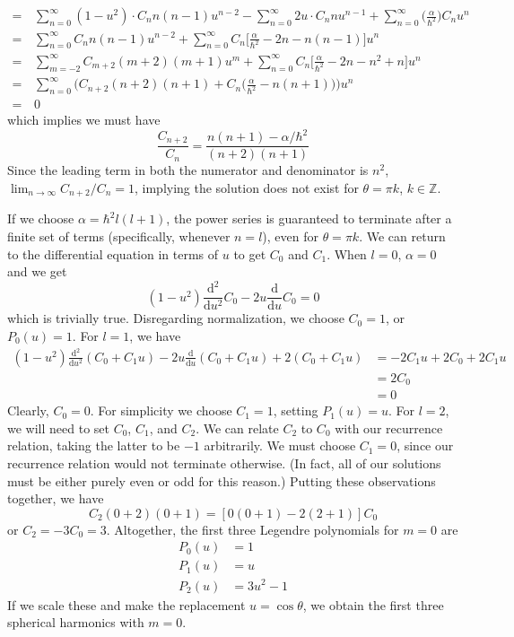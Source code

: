 \documentclass[../principles-of-quantum-mechanics.tex]{subfiles}
\begin{document}
\begin{questions}
\begin{solution}
\begin{align*}
				=\,&\sum_{n=0}^{\infty}(1 - u^2)\cdot C_n n(n-1) u^{n-2} - \sum_{n=0}^{\infty}2u\cdot C_nnu^{n-1} + \sum_{n=0}^{\infty}\Big(\frac{\alpha}{\hbar^2}\Big)C_n u^n \\
				=\,&\sum_{n=0}^{\infty}C_nn(n-1)u^{n-2} + \sum_{n=0}^{\infty}C_n\Big[\frac{\alpha}{\hbar^2} - 2n - n(n-1)\Big]u^n \\
				=\,&\sum_{m={-2}}^{\infty}C_{m + 2}(m + 2)(m + 1)u^m + \sum_{n=0}^{\infty}C_n\Big[\frac{\alpha}{\hbar^2} - 2n - n^2 + n\Big]u^n \\
				=\,&\sum_{n=0}^{\infty}\Big(C_{n+2}(n + 2)(n + 1) + C_n\big(\frac{\alpha}{\hbar^2} - n(n + 1)\big)\Big)u^n \\
				=\,&0
			\end{align*}
			which implies we must have
			$$\frac{C_{n+2}}{C_n} = \frac{n(n + 1) - \alpha/\hbar^2}{(n + 2)(n + 1)}$$
			Since the leading term in both the numerator and denominator is $n^2$, $\lim_{n\to\infty} C_{n+2}/C_n = 1$, implying the solution does not exist for $\theta = \pi k$, $k \in \mathbb{Z}$.
			
			If we choose $\alpha = \hbar^2l(l + 1)$, the power series is guaranteed to terminate after a finite set of terms (specifically, whenever $n = l$), even for $\theta = \pi k$. We can return to the differential equation in terms of $u$ to get $C_0$ and $C_1$. When $l = 0$, $\alpha = 0$ and we get
			$$(1 - u^2)\frac{\mathrm{d}^2}{\mathrm{d}u^2}C_0 - 2u\frac{\mathrm{d}}{\mathrm{d}u}C_0 = 0$$
			which is trivially true. Disregarding normalization, we choose $C_0 = 1$, or $P_0(u) = 1$. For $l = 1$, we have
			\begin{align*}
				(1 - u^2)\frac{\mathrm{d}^2}{\mathrm{d}u^2}(C_0 + C_1u) - 2u\frac{\mathrm{d}}{\mathrm{d}u}(C_0 + C_1u) + 2(C_0 + C_1u) &=-2C_1u + 2C_0 + 2C_1u \\
				&=2C_0 \\
				&=0
			\end{align*}
			Clearly, $C_0 = 0$. For simplicity we choose $C_1 = 1$, setting $P_1(u) = u$. For $l = 2$, we will need to set $C_0$, $C_1$, and $C_2$. We can relate $C_2$ to $C_0$ with our recurrence relation, taking the latter to be $-1$ arbitrarily. We must choose $C_1 = 0$, since our recurrence relation would not terminate otherwise. (In fact, all of our solutions must be either purely even or odd for this reason.) Putting these observations together, we have
			$$C_2(0 + 2)(0 + 1) = [0(0 + 1) - 2(2 + 1)]C_0$$
			or $C_2 = -3C_0 = 3$. Altogether, the first three Legendre polynomials for $m = 0$ are
			\begin{align*}
				P_0(u) &= 1 \\
				P_1(u) &= u \\
				P_2(u) &= 3u^2 - 1
			\end{align*}
			If we scale these and make the replacement $u = \cos\theta$, we obtain the first three spherical harmonics with $m = 0$.
		\end{solution}
	

\end{questions}
\end{document}
